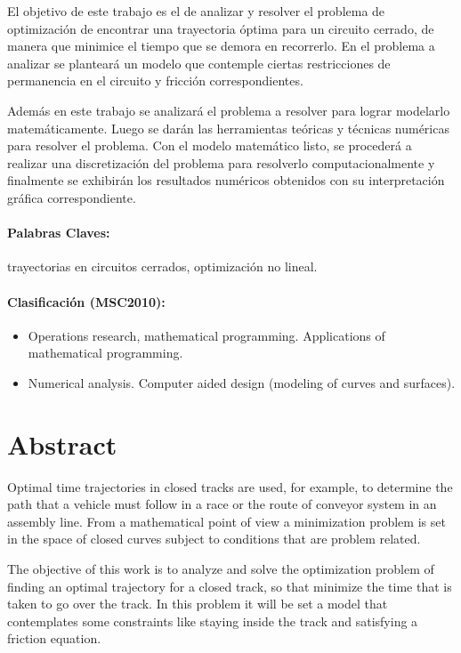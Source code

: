 \documentclass[a4paper,10pt]{book}
\begin{document}
    El objetivo de este trabajo es el de analizar y resolver el problema de optimización de encontrar una trayectoria óptima para un circuito cerrado, de manera que minimice el tiempo que se demora en recorrerlo. En el problema a analizar se planteará un modelo que contemple ciertas restricciones de permanencia en el circuito y fricción correspondientes.
    
    Además en este trabajo se analizará el problema a resolver para lograr modelarlo matemáticamente. Luego se darán las herramientas teóricas y técnicas numéricas para resolver el problema. Con el modelo matemático listo, se procederá a realizar una discretización del problema para resolverlo computacionalmente y finalmente se exhibirán los resultados numéricos obtenidos con su interpretación gráfica correspondiente.
    
\vfill
\paragraph{Palabras Claves:} trayectorias en circuitos cerrados, optimización no lineal.
\paragraph{Clasificación (MSC2010):}
\begin{itemize}
   \item[90C90] Operations research, mathematical programming. Applications of mathematical programming.
   \item[65D17] Numerical analysis. Computer aided design (modeling of curves and surfaces).
\end{itemize}
\newpage

\section*{Abstract}
   Optimal time trajectories in closed tracks are used, for example, to determine the path that a vehicle must follow in a race or the route of conveyor system in an assembly line.
   From a mathematical point of view a minimization problem is set in the space of closed curves subject to conditions that are problem related.
   
    The objective of this work is to analyze and solve the optimization problem of finding an optimal trajectory for a closed track, so that minimize the time that is taken to go over the track. In this problem it will be set a model that contemplates some constraints like staying inside the track and satisfying a friction equation.
    
\end{document}
